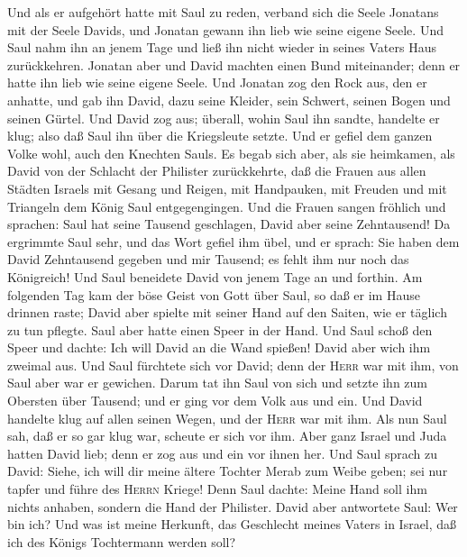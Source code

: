  Und als er aufgehört hatte mit Saul zu reden, verband
sich die Seele Jonatans mit der Seele Davids, und Jonatan gewann ihn
lieb wie seine eigene Seele.  Und Saul nahm ihn an jenem
Tage und ließ ihn nicht wieder in seines Vaters Haus zurückkehren.
 Jonatan aber und David machten einen Bund miteinander;
denn er hatte ihn lieb wie seine eigene Seele.  Und
Jonatan zog den Rock aus, den er anhatte, und gab ihn David, dazu seine
Kleider, sein Schwert, seinen Bogen und seinen Gürtel. 
Und David zog aus; überall, wohin Saul ihn sandte, handelte er klug;
also daß Saul ihn über die Kriegsleute setzte. Und er gefiel dem ganzen
Volke wohl, auch den Knechten Sauls.  Es begab sich aber,
als sie heimkamen, als David von der Schlacht der Philister
zurückkehrte, daß die Frauen aus allen Städten Israels mit Gesang und
Reigen, mit Handpauken, mit Freuden und mit Triangeln dem König Saul
entgegengingen.  Und die Frauen sangen fröhlich und
sprachen: Saul hat seine Tausend geschlagen, David aber seine
Zehntausend!  Da ergrimmte Saul sehr, und das Wort gefiel
ihm übel, und er sprach: Sie haben dem David Zehntausend gegeben und mir
Tausend; es fehlt ihm nur noch das Königreich!  Und Saul
beneidete David von jenem Tage an und forthin.  Am
folgenden Tag kam der böse Geist von Gott über Saul, so daß er im Hause
drinnen raste; David aber spielte mit seiner Hand auf den Saiten, wie er
täglich zu tun pflegte. Saul aber hatte einen Speer in der Hand.
 Und Saul schoß den Speer und dachte: Ich will David an
die Wand spießen! David aber wich ihm zweimal aus.  Und
Saul fürchtete sich vor David; denn der \textsc{Herr} war mit ihm, von
Saul aber war er gewichen.  Darum tat ihn Saul von sich
und setzte ihn zum Obersten über Tausend; und er ging vor dem Volk aus
und ein.  Und David handelte klug auf allen seinen Wegen,
und der \textsc{Herr} war mit ihm.  Als nun Saul sah, daß
er so gar klug war, scheute er sich vor ihm.  Aber ganz
Israel und Juda hatten David lieb; denn er zog aus und ein vor ihnen
her.  Und Saul sprach zu David: Siehe, ich will dir meine
ältere Tochter Merab zum Weibe geben; sei nur tapfer und führe des
\textsc{Herrn} Kriege! Denn Saul dachte: Meine Hand soll ihm nichts
anhaben, sondern die Hand der Philister.  David aber
antwortete Saul: Wer bin ich? Und was ist meine Herkunft, das Geschlecht
meines Vaters in Israel, daß ich des Königs Tochtermann werden soll?
